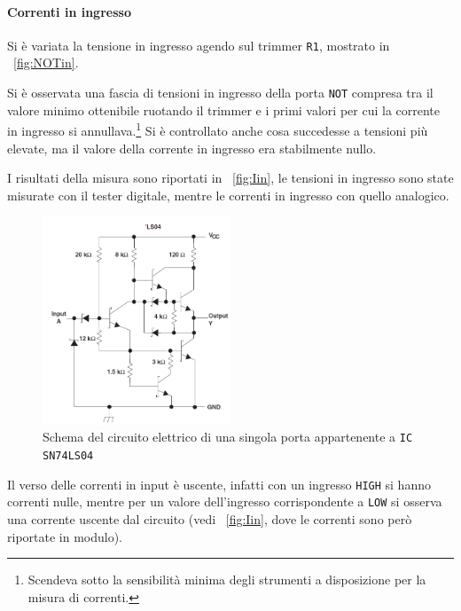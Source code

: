 \documentclass[a4paper,10pt]{article}
\def\code#1{\texttt{#1}}
\begin{document}
\paragraph{Correnti in ingresso}

Si è variata la tensione in ingresso agendo sul trimmer \code{R1}, mostrato in \figurename{~\ref{fig:NOTin}}.
	
Si è osservata una fascia di tensioni in ingresso della porta \code{NOT} compresa tra il valore minimo ottenibile ruotando il trimmer e i primi valori per cui la corrente in ingresso si annullava.\footnote{\label{nota:I0}Scendeva sotto la sensibilità minima degli strumenti a disposizione per la misura di correnti.} Si è controllato anche cosa succedesse a tensioni più elevate, ma il valore della corrente in ingresso era stabilmente nullo.

I risultati della misura sono riportati in \figurename{~\ref{fig:Iin}}, le tensioni in ingresso sono state misurate con il tester digitale, mentre le correnti in ingresso con quello analogico.

\begin{figure}[H]
	\centering
	\includegraphics[width=0.5\textwidth]{../grafici/LS04.png}
	\caption{Schema del circuito elettrico di una singola porta appartenente a \code{IC SN74LS04}}
	\label{fig:LS04}
\end{figure}

Il verso delle correnti in input è uscente, infatti con un ingresso \code{HIGH} si hanno correnti nulle, mentre per un valore dell'ingresso corrispondente a \code{LOW} si osserva una corrente uscente dal circuito (vedi \figurename{~\ref{fig:Iin}}, dove le correnti sono però riportate in modulo).
\end{document}
